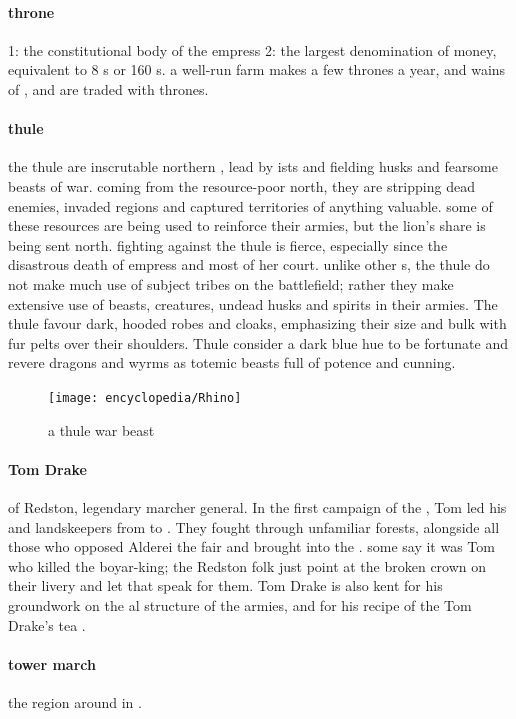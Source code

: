 \paragraph{throne} 1: the constitutional body of the empress 2: the largest denomination of money, equivalent to 8 s or 160 s. a well-run farm makes a few thrones a year, and wains of ,  and  are traded with thrones. 
\paragraph{thule} the thule are inscrutable northern , lead by ists and fielding husks and fearsome beasts of war. coming from the resource-poor north, they are stripping dead enemies, invaded regions and captured territories of anything valuable. some of these resources are being used to reinforce their armies, but the lion's share is being sent north. fighting against the thule is fierce, especially since the disastrous death of empress  and most of her court. unlike other s, the thule do not make much use of subject tribes on the battlefield; rather they make extensive use of beasts, creatures, undead husks and spirits in their armies. The thule favour dark, hooded robes and cloaks, emphasizing their size and bulk with fur pelts over their shoulders. Thule consider a dark blue hue to be fortunate and revere dragons and wyrms as totemic beasts full of potence and cunning.\begin{figure}\centering\texttt{[image: encyclopedia/Rhino]}\caption{a thule war beast}\end{figure}
\paragraph{Tom Drake} of Redston, legendary marcher general. In the first campaign of the , Tom led his  and landskeepers from  to . They fought through unfamiliar forests, alongside all those who opposed Alderei the fair and brought  into the . some say it was Tom who killed the boyar-king; the Redston folk just point at the broken crown on their livery and let that speak for them. Tom Drake is also kent for his groundwork on the al structure of the armies, and for his recipe of the Tom Drake's tea .
\paragraph{tower march} the region around  in .
